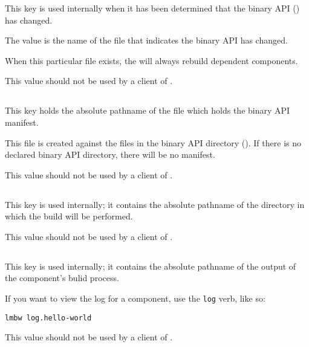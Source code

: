 This key is used internally when it has been determined that the
binary API () has changed.

The value is the name of the file that indicates the binary API has
changed.

When this particular file exists, the \lmsbw will always rebuild
dependent components.

This value should not be used by a client of \lmsbw.

\subsection{}

This key holds the absolute pathname of the file which holds the
binary API \mtree manifest.

This file is created against the files in the binary API directory
().  If there is no declared binary API
directory, there will be no manifest.

This value should not be used by a client of \lmsbw.

\subsection{}

This key is used internally; it contains the absolute pathname of the
directory in which the build will be performed.

This value should not be used by a client of \lmsbw.

\subsection{}

This key is used internally; it contains the absolute pathname of the
output of the component's bulid process.

If you want to view the log for a component, use the \texttt{log}
verb, like so:

\begin{verbatim}
lmbw log.hello-world
\end{verbatim}

This value should not be used by a client of \lmsbw.

\subsection{}


